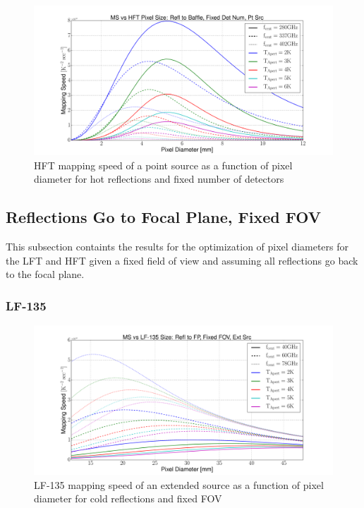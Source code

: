 \documentclass[12pt, titlepage]{article} %
\begin{document}
\begin{figure}[H]
	\centering
	\includegraphics[width=1.1\textwidth, center]{PDF/HFT_MS_hotRefl_fixDetNum_ptSrc.pdf}
	\caption{HFT mapping speed of a point source as a function of pixel diameter for hot reflections and fixed number of detectors}
\end{figure}


\subsection{Reflections Go to Focal Plane, Fixed FOV}

This subsection containts the results for the optimization of pixel diameters for the LFT and HFT given a fixed field of view and assuming all reflections go back to the focal plane.

\clearpage


\subsubsection{LF-135}

\begin{figure}[H]
	\centering
	\includegraphics[width=1.1\textwidth, center]{PDF/LFT_MS_LF-135_coldRefl_fixFOV_extSrc.pdf}
	\caption{LF-135 mapping speed of an extended source as a function of pixel diameter for cold reflections and fixed FOV}
\end{figure}
\end{document}
